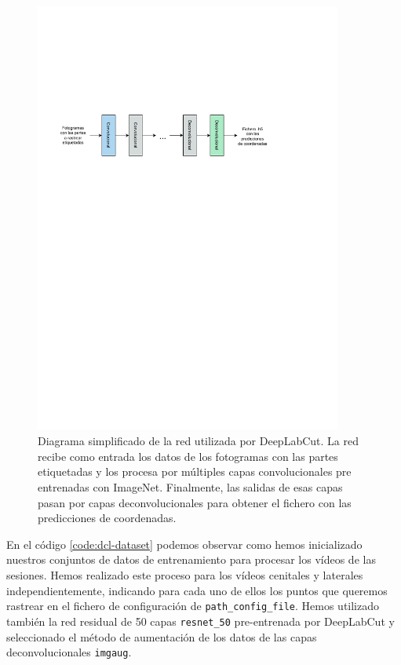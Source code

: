\begin{figure}[h]
  \centering
  \includegraphics[width=0.9\textwidth]{figures/diagram-dlc.pdf}
  \caption{Diagrama simplificado de la red utilizada por DeepLabCut. La red recibe como entrada los datos de los fotogramas con las partes etiquetadas y los procesa por múltiples capas convolucionales pre entrenadas con ImageNet. Finalmente, las salidas de esas capas pasan por capas deconvolucionales para obtener el fichero con las predicciones de coordenadas.}
  \label{fig:diagram-dlc}
\end{figure}

En el código \ref{code:dcl-dataset} podemos observar como hemos inicializado nuestros conjuntos de datos de entrenamiento para procesar los vídeos de las sesiones. Hemos realizado este proceso para los vídeos cenitales y laterales independientemente, indicando para cada uno de ellos los puntos que queremos rastrear en el fichero de configuración de \texttt{path\_config\_file}. Hemos utilizado también la red residual de 50 capas \texttt{resnet\_50} pre-entrenada por DeepLabCut y seleccionado el método de aumentación de los datos de las capas deconvolucionales \texttt{imgaug}.


